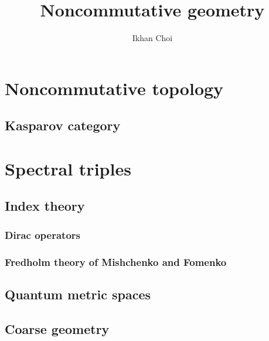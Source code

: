 \documentclass{../../large}
\begin{document}
\title{Noncommutative geometry}
\author{Ikhan Choi}
\maketitle
\tableofcontents



\part{Noncommutative topology}

\chapter{Kasparov category}

\section{}





\part{Spectral triples}

\chapter{Index theory}

\section{Dirac operators}

\section{Fredholm theory of Mishchenko and Fomenko}






\chapter{Quantum metric spaces}







\chapter{Coarse geometry}
\end{document}
